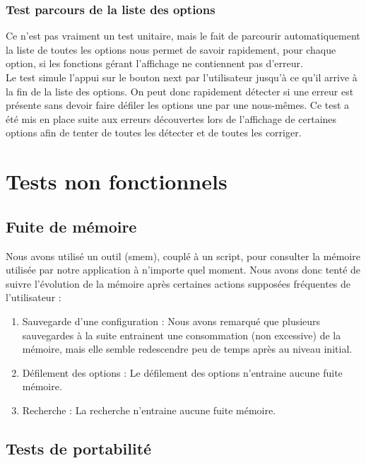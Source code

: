 \documentclass[16pts]{report}
\begin{document}
\subsubsection{Test parcours de la liste des options}

Ce n'est pas vraiment un test unitaire, mais le fait de parcourir 
automatiquement la liste de toutes les options nous permet de savoir rapidement,
pour chaque option, si les fonctions gérant l'affichage ne contiennent pas 
d'erreur.
\\

Le test simule l'appui sur le bouton next par l'utilisateur jusqu'à ce qu'il
arrive à la fin de la liste des options. On peut donc rapidement détecter si 
une erreur est présente sans devoir faire défiler les options une par une 
nous-mêmes. Ce test a été mis en place suite aux erreurs découvertes lors de
l'affichage de certaines options afin de tenter de toutes les détecter et de 
toutes les corriger.


    \section{Tests non fonctionnels}
    \label{sec:Tests non fonctionnels}

\subsection{Fuite de mémoire}

Nous avons utilisé un outil (smem), couplé à un script, pour consulter la 
mémoire utilisée par notre application à n'importe quel moment. Nous avons 
donc tenté de suivre l'évolution de la mémoire après certaines actions supposées
fréquentes de l'utilisateur :

\begin{enumerate}
	\item Sauvegarde d'une configuration : Nous avons remarqué que 
          plusieurs sauvegardes à la suite entrainent une consommation 
          (non excessive) de la mémoire, mais elle semble redescendre
          peu de temps après au niveau initial.

	\item Défilement des options : Le défilement des options n'entraine
          aucune fuite mémoire.
	\item Recherche : La recherche n'entraine aucune fuite mémoire.
\end{enumerate}


\subsection{Tests de portabilité}
\end{document}
